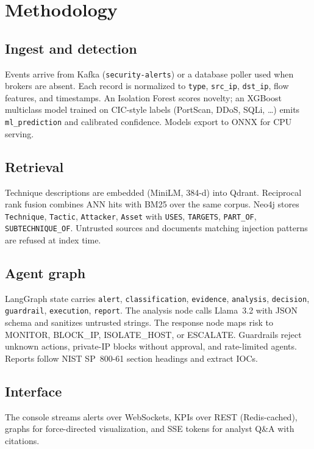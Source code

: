 \section{Methodology}

\subsection{Ingest and detection}
Events arrive from Kafka (\texttt{security-alerts}) or a database poller used when brokers are absent. Each record is normalized to \texttt{type}, \texttt{src\_ip}, \texttt{dst\_ip}, flow features, and timestamps. An Isolation Forest scores novelty; an XGBoost multiclass model trained on CIC-style labels (PortScan, DDoS, SQLi, \ldots) emits \texttt{ml\_prediction} and calibrated confidence. Models export to ONNX for CPU serving.

\subsection{Retrieval}
Technique descriptions are embedded (MiniLM, 384-d) into Qdrant. Reciprocal rank fusion combines ANN hits with BM25 over the same corpus. Neo4j stores \texttt{Technique}, \texttt{Tactic}, \texttt{Attacker}, \texttt{Asset} with \texttt{USES}, \texttt{TARGETS}, \texttt{PART\_OF}, \texttt{SUBTECHNIQUE\_OF}. Untrusted sources and documents matching injection patterns are refused at index time.

\subsection{Agent graph}
LangGraph state carries \texttt{alert}, \texttt{classification}, \texttt{evidence}, \texttt{analysis}, \texttt{decision}, \texttt{guardrail}, \texttt{execution}, \texttt{report}. The analysis node calls Llama~3.2 with JSON schema and sanitizes untrusted strings. The response node maps risk to MONITOR, BLOCK\_IP, ISOLATE\_HOST, or ESCALATE. Guardrails reject unknown actions, private-IP blocks without approval, and rate-limited agents. Reports follow NIST SP~800-61 section headings and extract IOCs.

\subsection{Interface}
The console streams alerts over WebSockets, KPIs over REST (Redis-cached), graphs for force-directed visualization, and SSE tokens for analyst Q\&A with citations.
